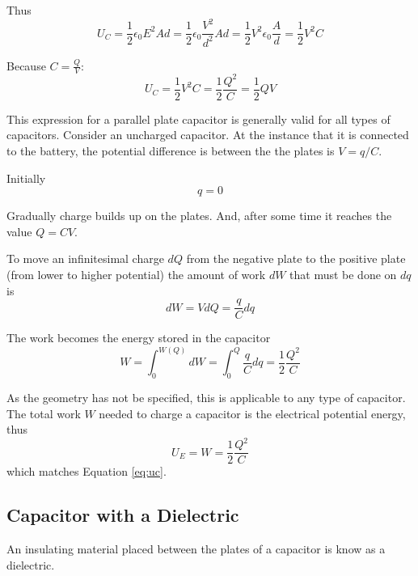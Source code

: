 \documentclass[14pt]{memoir}
\begin{document}
Thus
\begin{equation}
U_C = \frac{1}{2} \epsilon_0 E^2 Ad = \frac{1}{2} \epsilon_0 \frac{V^2}{d^2} Ad = \frac{1}{2} V^2 \epsilon_0 \frac{A}{d} = \frac{1}{2} V^2 C
\end{equation}

Because $C = \frac{Q}{V}$:
\begin{equation}
U_C =  \frac{1}{2} V^2 C = \frac{1}{2} \frac{Q^2}{C} = \frac{1}{2}QV
\label{eq:uc}
\end{equation}

This expression for a parallel plate capacitor is generally valid for all types of capacitors. Consider an uncharged capacitor. At the instance that it is connected to the battery, the potential difference is between the the plates is $V = q/C$.

Initially
\begin{equation}
q = 0
\end{equation}

Gradually charge builds up on the plates. And, after some time it reaches the value $Q = CV$. 

To move an infinitesimal charge $dQ$ from the negative plate to the positive plate (from lower to higher potential) the amount of work $dW$ that must be done on $dq$ is
\begin{equation}
dW = VdQ = \frac{q}{C}dq
\end{equation}

The work becomes the energy stored in the capacitor
\begin{equation}
W = \int_0^{W(Q)} dW = \int_0^Q \frac{q}{C}dq = \frac{1}{2} \frac{Q^2}{C}
\end{equation}

As the geometry has not be specified, this is applicable to any type of capacitor. The total work $W$ needed to charge a capacitor is the electrical potential energy, thus
\begin{equation}
U_E = W = \frac{1}{2} \frac{Q^2}{C}
\end{equation}
which matches Equation \ref{eq:uc}.

\subsection{Capacitor with a Dielectric}

An insulating material placed between the plates of a capacitor is know as a dielectric.
\end{document}
